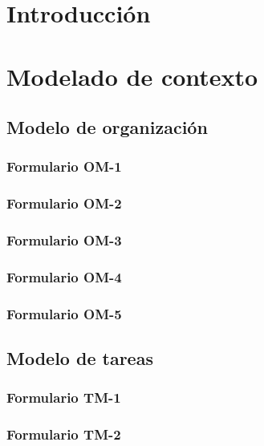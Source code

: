 \documentclass[a4paper,11pt]{article}
\begin{document}
	\newpage
	\tableofcontents
	\newpage
	\section{Introducción}
	\section{Modelado de contexto}
		\subsection{Modelo de organización}
			\subsubsection{Formulario OM-1}
			\subsubsection{Formulario OM-2}
			\subsubsection{Formulario OM-3}
			\subsubsection{Formulario OM-4}
			\subsubsection{Formulario OM-5}
		\subsection{Modelo de tareas}
			\subsubsection{Formulario TM-1}
			\subsubsection{Formulario TM-2}
\end{document}
